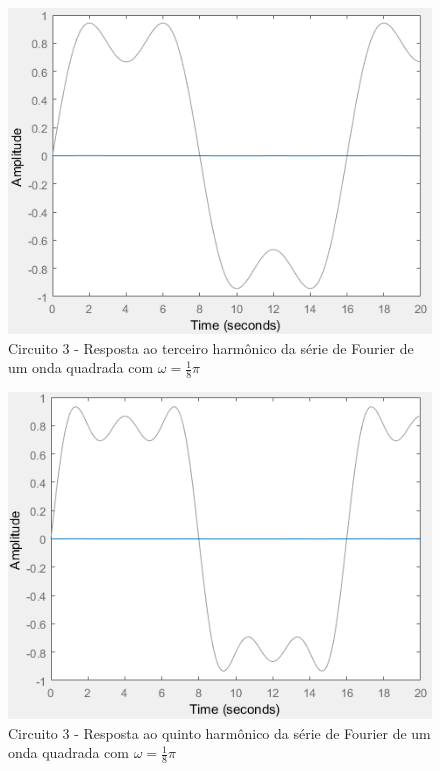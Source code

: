 \documentclass[a4paper, 12pt]{article}
\begin{document}
			\begin{figure}[!ht]
				\centering
				\includegraphics[scale=0.71]{img/1k_circ3.png}
				\caption{Circuito 3 - Resposta ao terceiro harmônico da série de Fourier de um onda quadrada com $\omega = \frac{1}{8}\pi$}
			\end{figure}
			\begin{figure}[!ht]
				\centering
				\includegraphics[scale=0.71]{img/1l_circ3.png}
				\caption{Circuito 3 - Resposta ao quinto harmônico da série de Fourier de um onda quadrada com $\omega = \frac{1}{8}\pi$}
			\end{figure}
			\clearpage
\end{document}
